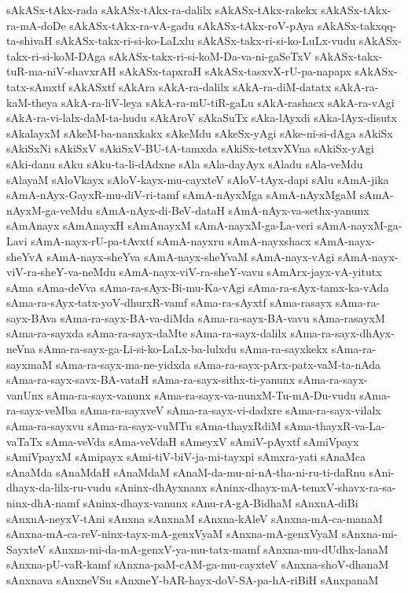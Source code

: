 {sAkASx-tAkx-rada
sAkASx-tAkx-ra-dalilx
sAkASx-tAkx-rakekx
sAkASx-tAkx-ra-mA-doDe
sAkASx-tAkx-ra-vA-gadu
sAkASx-tAkx-roV-pAya
sAkASx-takxqq-ta-shivaH
sAkASx-takx-ri-si-ko-LaLxlu
sAkASx-takx-ri-si-ko-LuLx-vudu
sAkASx-takx-ri-si-koM-DAga
sAkASx-takx-ri-si-koM-Da-va-ni-gaSeTxV
sAkASx-takx-tuR-ma-niV-shavxrAH
sAkASx-tapxraH
sAkASx-tasxvX-rU-pa-napapx
sAkASx-tatx-sAmxtf
sAkASxtf
sAkAra
sAkA-ra-dalilx
sAkA-ra-diM-datatx
sAkA-ra-kaM-theya
sAkA-ra-liV-leya
sAkA-ra-mU-tiR-gaLu
sAkA-rashacx
sAkA-ra-vAgi
sAkA-ra-vi-lalx-daM-ta-hudu
sAkAroV
sAkaSuTx
sAka-lAyxdi
sAka-lAyx-disutx
sAkalayxM
sAkeM-ba-nanxkakx
sAkeMdu
sAkeSx-yAgi
sAke-ni-si-dAga
sAkiSx
sAkiSxNi
sAkiSxV
sAkiSxV-BU-tA-tamxda
sAkiSx-tetxvXVna
sAkiSx-yAgi
sAki-danu
sAku
sAku-ta-li-dAdxne
sAla
sAla-dayAyx
sAladu
sAla-veMdu
sAlayaM
sAloVkayx
sAloV-kayx-mu-cayxteV
sAloV-tAyx-dapi
sAlu
sAmA-jika
sAmA-nAyx-GayxR-mu-diV-ri-tamf
sAmA-nAyxMga
sAmA-nAyxMgaM
sAmA-nAyxM-ga-veMdu
sAmA-nAyx-di-BeV-dataH
sAmA-nAyx-va-sethx-yanunx
sAmAnayx
sAmAnayxH
sAmAnayxM
sAmA-nayxM-ga-La-veri
sAmA-nayxM-ga-Lavi
sAmA-nayx-rU-pa-tAvxtf
sAmA-nayxru
sAmA-nayxshacx
sAmA-nayx-sheYvA
sAmA-nayx-sheYva
sAmA-nayx-sheYvaM
sAmA-nayx-vAgi
sAmA-nayx-viV-ra-sheY-va-neMdu
sAmA-nayx-viV-ra-sheY-vavu
sAmArx-jayx-vA-yitutx
sAma
sAma-deVva
sAma-ra-sAyx-Bi-mu-Ka-vAgi
sAma-ra-sAyx-tamx-ka-vAda
sAma-ra-sAyx-tatx-yoV-dhurxR-vamf
sAma-ra-sAyxtf
sAma-rasayx
sAma-ra-sayx-BAva
sAma-ra-sayx-BA-va-diMda
sAma-ra-sayx-BA-vavu
sAma-rasayxM
sAma-ra-sayxda
sAma-ra-sayx-daMte
sAma-ra-sayx-dalilx
sAma-ra-sayx-dhAyx-neVna
sAma-ra-sayx-ga-Li-si-ko-LaLx-ba-lulxdu
sAma-ra-sayxkekx
sAma-ra-sayxmaM
sAma-ra-sayx-ma-ne-yidxda
sAma-ra-sayx-pArx-patx-vaM-ta-nAda
sAma-ra-sayx-savx-BA-vataH
sAma-ra-sayx-sithx-ti-yanunx
sAma-ra-sayx-vanUnx
sAma-ra-sayx-vanunx
sAma-ra-sayx-va-nunxM-Tu-mA-Du-vudu
sAma-ra-sayx-veMba
sAma-ra-sayxveV
sAma-ra-sayx-vi-dadxre
sAma-ra-sayx-vilalx
sAma-ra-sayxvu
sAma-ra-sayx-vuMTu
sAma-thayxRdiM
sAma-thayxR-va-La-vaTaTx
sAma-veVda
sAma-veVdaH
sAmeyxV
sAmiV-pAyxtf
sAmiVpayx
sAmiVpayxM
sAmipayx
sAmi-tiV-biV-ja-mi-tayxpi
sAmxra-yati
sAnaMca
sAnaMda
sAnaMdaH
sAnaMdaM
sAnaM-da-mu-ni-nA-tha-ni-ru-ti-daRnu
sAni-dhayx-da-lilx-ru-vudu
sAninx-dhAyxnanx
sAninx-dhayx-mA-temxV-shavx-ra-sa-ninx-dhA-namf
sAninx-dhayx-vanunx
sAnu-rA-gA-BidhaM
sAnxnA-diBi
sAnxnA-neyxV-tAni
sAnxna
sAnxnaM
sAnxna-kAleV
sAnxna-mA-ca-manaM
sAnxna-mA-ca-reV-ninx-tayx-mA-genxVyaM
sAnxna-mA-genxVyaM
sAnxna-mi-SayxteV
sAnxna-mi-da-mA-genxV-ya-mu-tatx-mamf
sAnxna-mu-dUdhx-lanaM
sAnxna-pU-vaR-kamf
sAnxna-paM-cAM-ga-mu-cayxteV
sAnxna-shoV-dhanaM
sAnxnava
sAnxneVSu
sAnxneY-bAR-hayx-doV-SA-pa-hA-riBiH
sAnxpanaM
}
